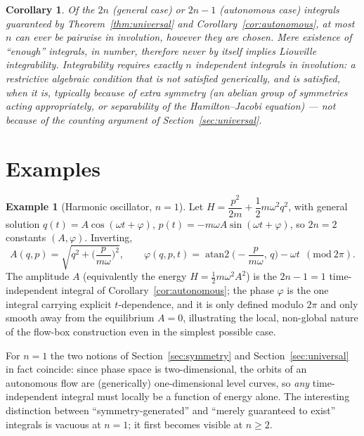 \documentclass[11pt]{article}
\newtheorem{corollary}[theorem]{Corollary}
\theoremstyle{definition}
\newtheorem{example}[theorem]{Example}
\theoremstyle{remark}
\begin{document}
\begin{corollary}\label{cor:bound}
Of the $2n$ (general case) or $2n-1$ (autonomous case) integrals guaranteed
by Theorem~\ref{thm:universal} and Corollary~\ref{cor:autonomous}, at most
$n$ can ever be pairwise in involution, however they are chosen. Mere
existence of ``enough'' integrals, in number, therefore never by itself
implies Liouville integrability. Integrability requires exactly $n$
independent integrals \emph{in involution}: a restrictive algebraic
condition that is not satisfied generically, and is satisfied, when it is,
typically because of extra symmetry (an abelian group of symmetries acting
appropriately, or separability of the Hamilton--Jacobi equation) --- not
because of the counting argument of Section~\ref{sec:universal}.
\end{corollary}

\section{Examples}\label{sec:examples}

\begin{example}[Harmonic oscillator, $n=1$]\label{ex:sho}
Let $H=\dfrac{p^2}{2m}+\dfrac12 m\omega^2q^2$, with general solution
$q(t)=A\cos(\omega t+\varphi)$, $p(t)=-m\omega A\sin(\omega t+\varphi)$, so
$2n=2$ constants $(A,\varphi)$. Inverting,
\begin{equation}
A(q,p)=\sqrt{q^2+\Big(\frac{p}{m\omega}\Big)^2},\qquad
\varphi(q,p,t)=\operatorname{atan2}\!\Big(-\frac{p}{m\omega},\,q\Big)-\omega t
\ \ (\mathrm{mod}\ 2\pi).
\end{equation}
The amplitude $A$ (equivalently the energy $H=\tfrac12m\omega^2A^2$) is the
$2n-1=1$ time-independent integral of Corollary~\ref{cor:autonomous}; the
phase $\varphi$ is the one integral carrying explicit $t$-dependence, and
it is only defined modulo $2\pi$ and only smooth away from the equilibrium
$A=0$, illustrating the local, non-global nature of the flow-box
construction even in the simplest possible case.

For $n=1$ the two notions of Section~\ref{sec:symmetry} and
Section~\ref{sec:universal} in fact coincide: since phase space is
two-dimensional, the orbits of an autonomous flow are (generically)
one-dimensional level curves, so \emph{any} time-independent integral must
locally be a function of energy alone. The interesting distinction between
``symmetry-generated'' and ``merely guaranteed to exist'' integrals is
vacuous at $n=1$; it first becomes visible at $n\ge 2$.
\end{example}
\end{document}
